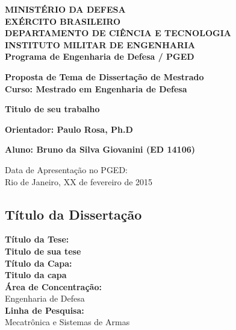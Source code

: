 \documentclass[a4paper, 12pt]{article}
\author{Seu nome}
\title{}
\begin{document}
\begin{center}
\textbf{MINISTÉRIO DA DEFESA}\\
\textbf{EXÉRCITO BRASILEIRO}\\
\textbf{DEPARTAMENTO DE CIÊNCIA E TECNOLOGIA}\\
\textbf{INSTITUTO MILITAR DE ENGENHARIA}\\
\textbf{Programa de Engenharia de Defesa / PGED}

\vspace{2.5cm}

\begin{large}
\textbf{Proposta de Tema de Dissertação de Mestrado
\\Curso: Mestrado em Engenharia de Defesa}

\vspace{1.5cm}

\textbf{Titulo de seu trabalho}

\vspace{1.5cm}


\textbf{Orientador: Paulo Rosa, Ph.D}

\end{large}

\vspace{1.5cm}

\textbf{Aluno: Bruno da Silva Giovanini (ED 14106)}


\vspace{2cm}

\begin{small}
Data de Apresentação no PGED:\\
Rio de Janeiro, XX de fevereiro de 2015
\end{small}

\end{center}


\newpage
\begin{large}
\section*{Título da Dissertação}
\textbf{Título da Tese:}\\
\textbf{Titulo de sua tese}\\

\noindent\textbf{Título da Capa:}\\
\textbf{Titulo da capa}\\

\noindent\textbf{Área de Concentração:}\\
Engenharia de Defesa\\

\noindent\textbf{Linha de Pesquisa:}\\
Mecatrônica e Sistemas de Armas\\
\end{large}
\end{document}
